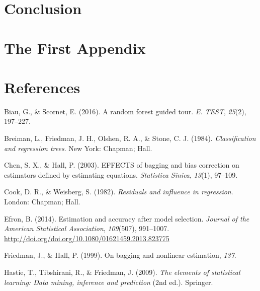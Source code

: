 \documentclass[12pt,twoside]{reedthesis}
\theoremstyle{definition}
\theoremstyle{definition}
\theoremstyle{definition}
\theoremstyle{remark}
\begin{document}
\chapter*{Conclusion}\label{conclusion}

\appendix

\chapter{The First Appendix}\label{the-first-appendix}

\backmatter

\chapter*{References}\label{references}


\noindent

\setlength{\parindent}{-0.20in} \setlength{\leftskip}{0.20in}
\setlength{\parskip}{8pt}

\hypertarget{refs}{}
\hypertarget{ref-biau2015a}{}
Biau, G., \& Scornet, E. (2016). A random forest guided tour. \emph{E.
TEST}, \emph{25}(2), 197--227.

\hypertarget{ref-breiman1984}{}
Breiman, L., Friedman, J. H., Olshen, R. A., \& Stone, C. J. (1984).
\emph{Classification and regression trees}. New York: Chapman; Hall.

\hypertarget{ref-chen2003}{}
Chen, S. X., \& Hall, P. (2003). EFFECTS of bagging and bias correction
on estimators defined by estimating equations. \emph{Statistica Sinica},
\emph{13}(1), 97--109.

\hypertarget{ref-cook1982}{}
Cook, D. R., \& Weisberg, S. (1982). \emph{Residuals and influence in
regression}. London: Chapman; Hall.

\hypertarget{ref-efron2014}{}
Efron, B. (2014). Estimation and accuracy after model selection.
\emph{Journal of the American Statistical Association}, \emph{109}(507),
991--1007. \url{http://doi.org/doi.org/10.1080/01621459.2013.823775}

\hypertarget{ref-hall1999}{}
Friedman, J., \& Hall, P. (1999). On bagging and nonlinear estimation,
\emph{137}.

\hypertarget{ref-esl2009}{}
Hastie, T., Tibshirani, R., \& Friedman, J. (2009). \emph{The elements
of statistical learning: Data mining, inference and prediction} (2nd
ed.). Springer.
\end{document}
